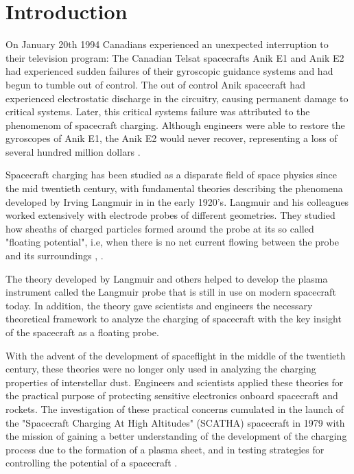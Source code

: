 \chapter{Introduction}
\label{sec:intro}

On January 20th 1994 Canadians experienced an unexpected interruption to their television program: The Canadian Telsat spacecrafts Anik E1 and Anik E2 had experienced sudden failures of their gyroscopic guidance systems and had begun to tumble out of control. The out of control Anik spacecraft had experienced electrostatic discharge in the circuitry, causing permanent damage to critical systems. Later, this critical systems failure was attributed to the phenomenom of spacecraft charging. Although engineers were able to restore the gyroscopes of Anik E1, the Anik E2 would never recover, representing a loss of several hundred million dollars \parencite{Leach1995}.

Spacecraft charging has been studied as a disparate field of space physics since the mid twentieth century, with fundamental theories describing the phenomena developed by Irving Langmuir in in the early 1920's. Langmuir and his colleagues worked extensively with electrode probes of different geometries. They studied how sheaths of charged particles formed around the probe at its so called "floating potential", i.e, when there is no net current flowing between the probe and its surroundings \parencite{Mott-Smith1926}, \parencite{Garrett1981}. 

The theory developed by Langmuir and others helped to develop the plasma instrument called the Langmuir probe that is still in use on modern spacecraft today. In addition, the theory gave scientists and engineers the necessary theoretical framework to analyze the charging of spacecraft with the key insight of the spacecraft as a floating probe. 

With the advent of the development of spaceflight in the middle of the twentieth century, these theories were no longer only used in analyzing the charging properties of interstellar dust. Engineers and scientists applied these theories for the practical purpose of protecting sensitive electronics onboard spacecraft and rockets. The investigation of these practical concerns cumulated in the launch of the "Spacecraft Charging At High Altitudes" (SCATHA) spacecraft in 1979 with the mission of gaining a better understanding of the development of the charging process due to the formation of a plasma sheet, and in testing strategies for controlling the potential of a spacecraft \parencite{SCATHA2020}. 

